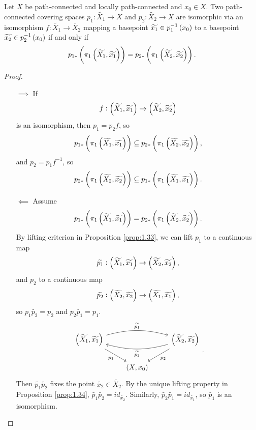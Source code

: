 \begin{proposition}
\label{prop:1.37}
Let $ X $ be path-connected and locally path-connected and $ x_0 \in X $. Two path-connected covering spaces $ p_1 : \widetilde{X_1} \to X $ and $ p_2 : \widetilde{X_2} \to X $ are isomorphic via an isomorphism $ f : \widetilde{X_1} \to \widetilde{X_2} $ mapping a basepoint $ \widetilde{x_1} \in p_1^{-1}\br{x_0} $ to a basepoint $ \widetilde{x_2} \in p_2^{-1}\br{x_0} $ if and only if
$$ p_{1*}\br{\pi_1\br{\widetilde{X_1}, \widetilde{x_1}}} = p_{2*}\br{\pi_1\br{\widetilde{X_2}, \widetilde{x_2}}}. $$
\end{proposition}

\begin{proof}
\hfill
\begin{itemize}
\item[$ \implies $] If
$$ f : \br{\widetilde{X_1}, \widetilde{x_1}} \to \br{\widetilde{X_2}, \widetilde{x_2}} $$
is an isomorphism, then $ p_1 = p_2f $, so
$$ p_{1*}\br{\pi_1\br{\widetilde{X_1}, \widetilde{x_1}}} \subseteq p_{2*}\br{\pi_1\br{\widetilde{X_2}, \widetilde{x_2}}}, $$
and $ p_2 = p_1f^{-1} $, so
$$ p_{2*}\br{\pi_1\br{\widetilde{X_2}, \widetilde{x_2}}} \subseteq p_{1*}\br{\pi_1\br{\widetilde{X_1}, \widetilde{x_1}}}. $$
\item[$ \impliedby $] Assume
$$ p_{1*}\br{\pi_1\br{\widetilde{X_1}, \widetilde{x_1}}} = p_{2*}\br{\pi_1\br{\widetilde{X_2}, \widetilde{x_2}}}. $$
By lifting criterion in Proposition \ref{prop:1.33}, we can lift $ p_1 $ to a continuous map
$$ \widetilde{p_1} : \br{\widetilde{X_1}, \widetilde{x_1}} \to \br{\widetilde{X_2}, \widetilde{x_2}}, $$
and $ p_2 $ to a continuous map
$$ \widetilde{p_2} : \br{\widetilde{X_2}, \widetilde{x_2}} \to \br{\widetilde{X_1}, \widetilde{x_1}}, $$
so $ p_1\widetilde{p_2} = p_2 $ and $ p_2\widetilde{p_1} = p_1 $.
$$
\begin{tikzcd}
\br{\widetilde{X_1}, \widetilde{x_1}} \arrow[bend left=15]{rr}{\widetilde{p_1}} \arrow[swap]{dr}{p_1} & & \br{\widetilde{X_2}, \widetilde{x_2}} \arrow{dl}{p_2} \arrow[bend left=15]{ll}{\widetilde{p_2}} \\
& \br{X, x_0} &
\end{tikzcd}.
$$
Then $ \widetilde{p_1}\widetilde{p_2} $ fixes the point $ \widetilde{x_2} \in \widetilde{X_2} $. By the unique lifting property in Proposition \ref{prop:1.34}, $ \widetilde{p_1}\widetilde{p_2} = id_{\widetilde{x_2}} $. Similarly, $ \widetilde{p_2}\widetilde{p_1} = id_{\widetilde{x_1}} $, so $ \widetilde{p_1} $ is an isomorphism.
\end{itemize}
\end{proof}

